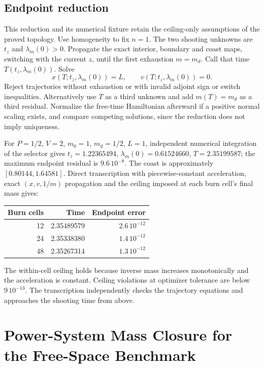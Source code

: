 \documentclass[journal,a4paper]{IEEEtran}
\begin{document}
\subsection{Endpoint reduction}
This reduction and its numerical fixture retain the ceiling-only
assumptions of the proved topology.
Use homogeneity to fix $n=1$. The two shooting unknowns are $t_z$ and
$\lambda_m(0)>0$. Propagate the exact interior, boundary and coast maps,
switching with the current $z$, until the first exhaustion $m=m_d$.
Call that time $T(t_z,\lambda_m(0))$. Solve
\begin{equation}
 x(T;t_z,\lambda_m(0))=L,\qquad
 v(T;t_z,\lambda_m(0))=0.
\end{equation}
Reject trajectories without exhaustion or with invalid adjoint sign or
switch inequalities. Alternatively use $T$ as a third unknown and add
$m(T)=m_d$ as a third residual. Normalize the free-time Hamiltonian
afterward if a positive normal scaling exists, and compare competing
solutions, since the reduction does not imply uniqueness.

For $P=1/2$, $V=2$, $m_0=1$, $m_d=1/2$, $L=1$, independent numerical
integration of the selector gives
$t_z=1.22365494$, $\lambda_m(0)=0.61524660$, $T=2.35199587$;
the maximum endpoint residual is $9.6\,10^{-8}$. The coast is approximately
$[0.80144,1.64581]$. Direct transcription with piecewise-constant
acceleration, exact $(x,v,1/m)$ propagation and the ceiling imposed at
each burn cell's final mass gives:
\begin{center}\begin{tabular}{rrr}\toprule
Burn cells&Time&Endpoint error\\\midrule
12&2.35489579&$2.6\,10^{-12}$\\
24&2.35338380&$1.4\,10^{-12}$\\
48&2.35267314&$1.3\,10^{-12}$\\\bottomrule
\end{tabular}\end{center}
The within-cell ceiling holds because inverse mass increases monotonically
and the acceleration is constant. Ceiling violations at optimizer tolerance
are below $9\,10^{-13}$. The transcription independently checks the
trajectory equations and approaches the shooting time from above.


\section{Power-System Mass Closure for the Free-Space Benchmark}
\label{sec:appendix_mass_closure}
\end{document}
